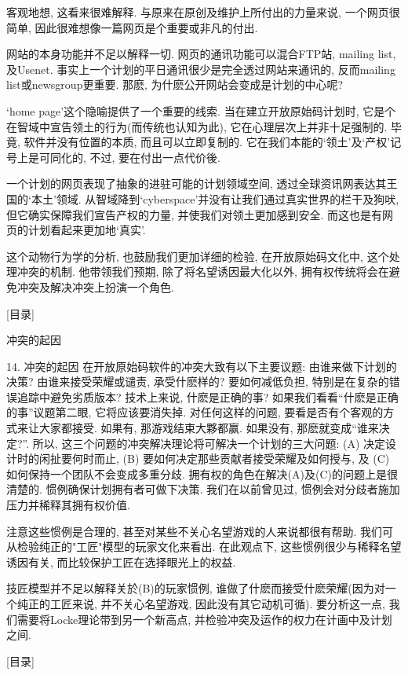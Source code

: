 \documentclass[a4paper,12pt,UTF8,twoside]{ctexbook}
\begin{document}
客观地想, 这看来很难解释. 与原来在原创及维护上所付出的力量来说, 一个网页很简单, 因此很难想像一篇网页是个重要或非凡的付出.

网站的本身功能并不足以解释一切. 网页的通讯功能可以混合FTP站, mailing list, 及Usenet. 事实上一个计划的平日通讯很少是完全透过网站来通讯的, 反而mailing list或newsgroup更重要. 那麽, 为什麽公开网站会变成是计划的中心呢?

`home page'这个隐喻提供了一个重要的线索. 当在建立开放原始码计划时, 它是个在智域中宣告领土的行为(而传统也认知为此), 它在心理层次上并非十足强制的. 毕竟, 软件并没有位置的本质, 而且可以立即复制的. 它在我们本能的`领土'及`产权'记号上是可同化的, 不过, 要在付出一点代价後.

一个计划的网页表现了抽象的进驻可能的计划领域空间, 透过全球资讯网表达其王国的`本土'领域. 从智域降到`cyberspace'并没有让我们通过真实世界的栏干及狗吠, 但它确实保障我们宣告产权的力量, 并使我们对领土更加感到安全. 而这也是有网页的计划看起来更加地`真实'.

这个动物行为学的分析, 也鼓励我们更加详细的检验, 在开放原始码文化中, 这个处理冲突的机制. 他带领我们预期, 除了将名望诱因最大化以外, 拥有权传统将会在避免冲突及解决冲突上扮演一个角色.


[目录]

冲突的起因

14. 冲突的起因
在开放原始码软件的冲突大致有以下主要议题:
由谁来做下计划的决策?
由谁来接受荣耀或谴责, 承受什麽样的?
要如何减低负担, 特别是在复杂的错误追踪中避免劣质版本?
技术上来说, 什麽是正确的事?
如果我们看看``什麽是正确的事''议题第二眼, 它将应该要消失掉.  对任何这样的问题, 要看是否有个客观的方式来让大家都接受. 如果有, 那游戏结束大夥都赢. 如果没有, 那麽就变成``谁来决定?''.
所以, 这三个问题的冲突解决理论将可解决一个计划的三大问题: (A) 决定设计时的闲扯要何时而止, (B) 要如何决定那些贡献者接受荣耀及如何授与, 及 (C) 如何保持一个团队不会变成多重分歧.
拥有权的角色在解决(A)及(C)的问题上是很清楚的. 惯例确保计划拥有者可做下决策. 我们在以前曾见过, 惯例会对分歧者施加压力并稀释其拥有权价值.

注意这些惯例是合理的, 甚至对某些不关心名望游戏的人来说都很有帮助.  我们可从检验纯正的"工匠"模型的玩家文化来看出. 在此观点下, 这些惯例很少与稀释名望诱因有关, 而比较保护工匠在选择眼光上的权益.

技匠模型并不足以解释关於(B)的玩家惯例, 谁做了什麽而接受什麽荣耀(因为对一个纯正的工匠来说, 并不关心名望游戏, 因此没有其它动机可循). 要分析这一点, 我们需要将Locke理论带到另一个新高点, 并检验冲突及运作的权力在计画中及计划之间.


[目录]
\end{document}
